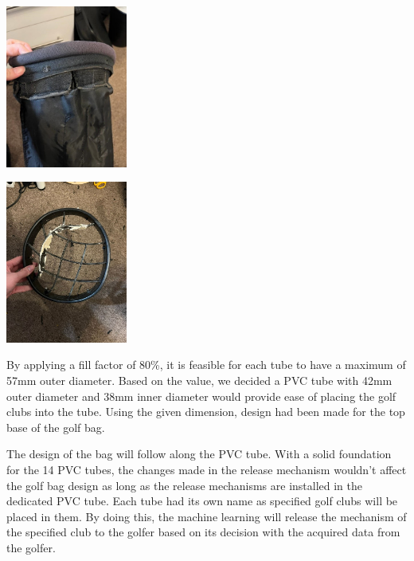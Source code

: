 \documentclass[11pt,landscape]{article}
\newenvironment{Figure}
  {\par\medskip\noindent\minipage{\linewidth}}
  {\endminipage\par\medskip}
\begin{document}
\begin{multicols}{3}
    \begin{Figure}
        \begin{center}
            \includegraphics[width=0.3\textwidth]{Figure3.jpg}
            \label{fig:cloth}
        \end{center}
    \end{Figure}
    
    \begin{Figure}
        \begin{center}
            \includegraphics[width=0.3\textwidth]{Figure2.jpg}
            \label{fig:top}
        \end{center}
    \end{Figure}
    
    
    By applying a fill factor of 80\%, it is feasible for each tube to have a
    maximum of 57mm outer diameter. Based on the value, we decided a PVC tube
    with 42mm outer diameter and 38mm inner diameter would provide ease of
    placing the golf clubs into the tube. Using the given dimension, design had
    been made for the top base of the golf bag.
    
    The design of the bag will follow along the PVC tube. With a solid
    foundation for the 14 PVC tubes, the changes made in the release mechanism
    wouldn’t affect the golf bag design as long as the release mechanisms are
    installed in the dedicated PVC tube. Each tube had its own name as specified
    golf clubs will be placed in them. By doing this, the machine learning will
    release the mechanism of the specified club to the golfer based on its
    decision with the acquired data from the golfer. 
    

\end{multicols}
\end{document}

